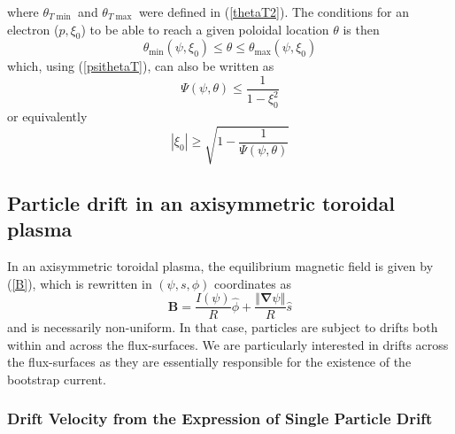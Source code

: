 where $\theta_{T\min}$ and $\theta_{T\max}$ were defined in (\ref{thetaT2}).
The conditions for an electron ($p,\xi_{0}$) to be able to reach a given
poloidal location $\theta$ is then 
\begin{equation}
\theta_{\min}\left( \psi,\xi_{0}\right) \leq\theta\leq\theta_{\max}\left(
\psi,\xi_{0}\right)   \label{thetacond}
\end{equation}
which, using (\ref{psithetaT}), can also be written as%
\begin{equation}
\Psi\left( \psi,\theta\right) \leq\dfrac{1}{1-\xi_{0}^{2}}
\end{equation}
or equivalently%
\begin{equation}
\left\vert \xi_{0}\right\vert \geq\sqrt{1-\dfrac{1}{\Psi\left( \psi
,\theta\right) }}   \label{xi0cond}
\end{equation}

\subsection{Particle drift in an axisymmetric toroidal plasma}

In an axisymmetric toroidal plasma, the equilibrium magnetic field is given
by (\ref{B}), which is rewritten in $\left( \psi,s,\phi\right) $ coordinates
as 
\begin{equation}
\mathbf{B}=\frac{I\left( \psi\right) }{R}\widehat{\phi}+\dfrac{\left\Vert 
\mathbf{\nabla}\psi\right\Vert }{R}\widehat{s}   \label{bexp2}
\end{equation}
and is necessarily non-uniform. In that case, particles are subject to
drifts both within and across the flux-surfaces. We are particularly
interested in drifts across the flux-surfaces as they are essentially
responsible for the existence of the bootstrap current.

\subsubsection{Drift Velocity from the Expression of Single Particle Drift}

